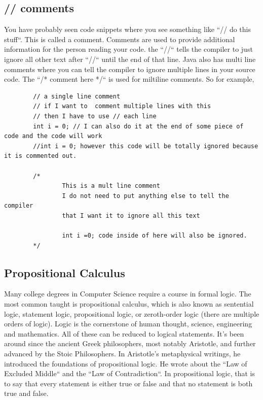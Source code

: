 \documentclass[11]{article}
\begin{document}
\subsection{// comments}
You have probably seen code snippets where you see something like ``// do this stuff``. This is called a comment. Comments are used to provide additional information for the person reading your code. the ``//`` tells the compiler to just ignore all other text after ``//`` until the end of that line. Java also has multi line comments where you can tell the compiler to ignore multiple lines in your source code. The ``/* comment here */`` is used for miltiline comments. So for example, 

\begin{lstlisting}
        // a single line comment
        // if I want to  comment multiple lines with this
        // then I have to use // each line
        int i = 0; // I can also do it at the end of some piece of code and the code will work
        //int i = 0; however this code will be totally ignored because it is commented out.
        
        /*
				This is a mult line comment
				I do not need to put anything else to tell the compiler
				that I want it to ignore all this text
				
				int i =0; code inside of here will also be ignored.        
        */
\end{lstlisting}

\subsection{Propositional Calculus}
Many college degrees in Computer Science require a course in formal logic. The most common taught is propositional calculus, which is also known as sentential logic, statement logic, propositional logic,  or zeroth-order logic (there are multiple orders of logic). Logic is the cornerstone of human thought, science, engineering and mathematics. All of these can be reduced to logical statements. It's been around since the ancient Greek philosophers, most notably Aristotle, and further advanced by the Stoic Philosophers. In Aristotle's metaphysical writings, he introduced the foundations of propositional logic. He wrote about the ``Law of Excluded Middle`` and the ``Law of Contradiction``. In propositional logic, that is to say that every statement is either true or false and that no statement is both true and false.\\
\end{document}

